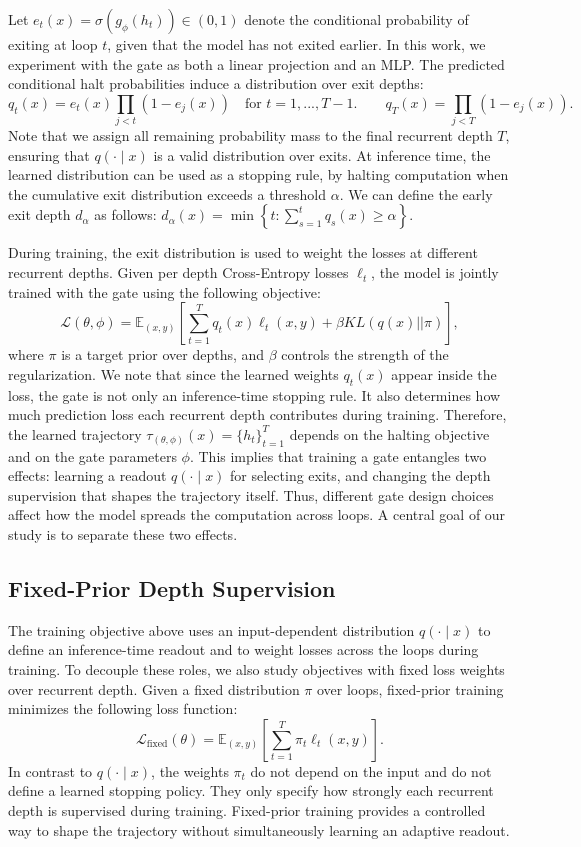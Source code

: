 \documentclass[10pt]{article} %
\begin{document}
Let \( e_t(x)=\sigma(g_\phi(h_t)) \in (0,1) \) denote the conditional probability of exiting at loop \(t\), given that the model has not exited earlier. In this work, we experiment with the gate as both a linear projection and an MLP. The predicted conditional halt probabilities induce a distribution over exit depths:
\[ q_t(x)=e_t(x)\prod_{j<t}\left(1-e_j(x)\right)\quad \text{for }t=1,...,T-1. \qquad q_T(x)=\prod_{j<T}\left(1-e_j(x)\right). \]
Note that we assign all remaining probability mass to the final recurrent depth \(T\), ensuring that \(q(\cdot\mid x)\) is a valid distribution over exits. At inference time, the learned distribution can be used as a stopping rule, by halting computation when the cumulative exit distribution exceeds a threshold $\alpha$. We can define the early exit depth $d_\alpha$ as follows: \( d_\alpha(x) = \min\left\{ t: \sum_{s=1}^t q_s(x)\ge \alpha \right\}. \)

During training, the exit distribution is used to weight the losses at different recurrent depths. Given per depth Cross-Entropy losses \(\ell_t\), the model is jointly trained with the gate using the following objective:
\[ \mathcal{L}(\theta,\phi) = \mathbb{E}_{(x,y)} \left[ \sum_{t=1}^T q_t(x)\ell_t(x,y) + \beta KL(q(x) || \pi) \right], \]
where $\pi$ is a target prior over depths, and \(\beta\) controls the strength of the regularization. We note that since the learned weights \(q_t(x)\) appear inside the loss, the gate is not only an inference-time stopping rule. It also determines how much prediction loss each recurrent depth contributes during training. Therefore, the learned trajectory $\tau_{(\theta,\phi)}(x)=\{h_t\}_{t=1}^T$ depends on the halting objective and on the gate parameters \(\phi\). This implies that training a gate entangles two effects: learning a readout \(q(\cdot\mid x)\) for selecting exits, and changing the depth supervision that shapes the trajectory itself. Thus, different gate design choices affect how the model spreads the computation across loops. A central goal of our study is to separate these two effects.
\subsection{Fixed-Prior Depth Supervision}
\label{sec:fixed_prior}
The training objective above uses an input-dependent distribution \(q(\cdot\mid x)\) to define an inference-time readout and to weight losses across the loops during training. To decouple these roles, we also study objectives with fixed loss weights over recurrent depth. Given a fixed distribution \(\pi\) over loops, fixed-prior training minimizes the following loss function:
\[ \mathcal{L}_{\mathrm{fixed}}(\theta) = \mathbb{E}_{(x,y)} \left[ \sum_{t=1}^T \pi_t \ell_t(x,y) \right]. \]
In contrast to \(q(\cdot\mid x)\), the weights \(\pi_t\) do not depend on the input and do not define a learned stopping policy. They only specify how strongly each recurrent depth is supervised during training. Fixed-prior training provides a controlled way to shape the trajectory without simultaneously learning an adaptive readout. 
\end{document}

